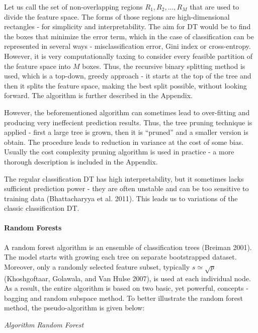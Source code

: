 \documentclass[12pt,]{article}
\let\oldparagraph\paragraph
\renewcommand{\paragraph}[1]{\oldparagraph{#1}\mbox{}}
\begin{document}
Let us call the set of non-overlapping regions \(R_1,R_2,...,R_M\) that
are used to divide the feature space. The forms of those regions are
high-dimensional rectangles - for simplicity and interpretability. The
aim for DT would be to find the boxes that minimize the error term,
which in the case of classification can be represented in several ways -
misclassification error, Gini index or cross-entropy. However, it is
very computationally taxing to consider every feasible partition of the
feature space into \(M\) boxes. Thus, the recursive binary splitting
method is used, which is a top-down, greedy approach - it starts at the
top of the tree and then it splits the feature space, making the best
split possible, without looking forward. The algorithm is further
described in the Appendix.

However, the beforementioned algorithm can sometimes lead to
over-fitting and producing very ineffecient prediction results. Thus,
the tree pruning technique is applied - first a large tree is grown,
then it is ``pruned'' and a smaller version is obtain. The procedure
leads to reduction in variance at the cost of some bias. Usually the
cost complexity pruning algorithm is used in practice - a more thorough
description is included in the Appendix.

The regular classification DT has high interpretability, but it
sometimes lacks sufficient prediction power - they are often unstable
and can be too sensitive to training data (Bhattacharyya et al. 2011).
This leads us to variations of the classic classification DT.

\hypertarget{random-forests}{%
\paragraph{Random Forests}\label{random-forests}}

A random forest algorithm is an ensemble of classification trees
(Breiman 2001). The model starts with growing each tree on separate
bootstrapped dataset. Moreover, only a randomly selected feature subset,
typically \(s \simeq \sqrt{p}\) (Khoshgoftaar, Golawala, and Van Hulse
2007), is used at each individual node. As a result, the entire
algorithm is based on two basic, yet powerful, concepts - bagging and
random subspace method. To better illustrate the random forest method,
the pseudo-algorithm is given below:

\emph{Algorithm Random Forest}
\end{document}
